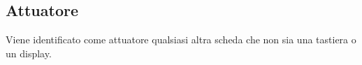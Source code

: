 \documentclass{article}
\begin{document}
    \subsection*{Attuatore}
    
    Viene identificato come attuatore qualsiasi altra scheda che non sia una tastiera o un display. 
    
%    
%    
%    
%       
%       
\end{document}

